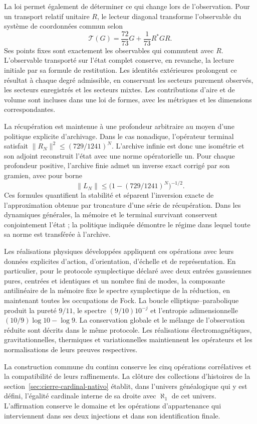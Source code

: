 La loi permet également de déterminer ce qui change lors de l’observation. Pour un transport relatif unitaire \(R\), le lecteur diagonal transforme l’observable du système de coordonnées commun selon
\[
 \mathcal T(G)=\frac{72}{73}G+\frac1{73}R^*GR.
\]
Ses points fixes sont exactement les observables qui commutent avec \(R\). L’observable transporté sur l’état complet conserve, en revanche, la lecture initiale par sa formule de restitution. Les identités extérieures prolongent ce résultat à chaque degré admissible, en conservant les secteurs purement observés, les secteurs enregistrés et les secteurs mixtes. Les contributions d’aire et de volume sont incluses dans une loi de formes, avec les métriques et les dimensions correspondantes.

La récupération est maintenue à une profondeur arbitraire au moyen d’une politique explicite d’archivage. Dans le cas nonadique, l’opérateur terminal satisfait \(\|R_N\|^2\leq(729/1241)^N\). L’archive infinie est donc une isométrie et son adjoint reconstruit l’état avec une norme opératorielle un. Pour chaque profondeur positive, l’archive finie admet un inverse exact corrigé par son gramien, avec pour borne
\[
 \|L_N\|\leq\bigl(1-(729/1241)^N\bigr)^{-1/2}.
\]
Ces formules quantifient la stabilité et séparent l'inversion exacte de l'approximation obtenue par troncature d'une série de récupération. Dans les dynamiques générales, la mémoire et le terminal survivant conservent conjointement l'état ; la politique indiquée démontre le régime dans lequel toute sa norme est transférée à l'archive.

Les réalisations physiques développées appliquent ces opérations avec leurs données explicites d’action, d’orientation, d’échelle et de représentation. En particulier, pour le protocole symplectique déclaré avec deux entrées gaussiennes pures, centrées et identiques et un nombre fini de modes, la composante antilinéaire de la mémoire fixe le spectre symplectique de la réduction, en maintenant toutes les occupations de Fock. La boucle elliptique--parabolique produit la pureté \(9/11\), le spectre \((9/10)10^{-j}\) et l’entropie adimensionnelle \((10/9)\log10-\log9\). La conservation globale et le mélange de l’observation réduite sont décrits dans le même protocole. Les réalisations électromagnétiques, gravitationnelles, thermiques et variationnelles maintiennent les opérateurs et les normalisations de leurs preuves respectives.

La construction commune du continu conserve les cinq opérations corrélatives et la compatibilité de leurs raffinements. La clôture des collections d’histoires de la section~\ref{sec:cierre-cardinal-nativo} établit, dans l’univers généalogique qui y est défini, l’égalité cardinale interne de sa droite avec \(\aleph_1\) de cet univers. L’affirmation conserve le domaine et les opérations d’appartenance qui interviennent dans ses deux injections et dans son identification finale.

